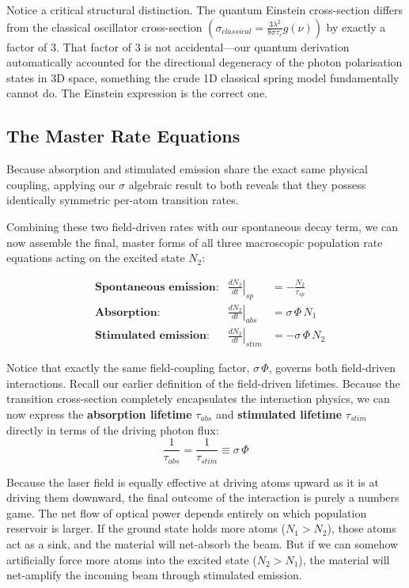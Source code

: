 Notice a critical structural distinction. The quantum Einstein cross-section differs from the classical oscillator cross-section $\left(\sigma_{classical} = \frac{3\lambda^2}{8\pi\tau_r}g(\nu)\right)$ by exactly a factor of 3. That factor of 3 is not accidental—our quantum derivation automatically accounted for the directional degeneracy of the photon polarisation states in 3D space, something the crude 1D classical spring model fundamentally cannot do. The Einstein expression is the correct one.

\subsection{The Master Rate Equations}

Because absorption and stimulated emission share the exact same physical coupling, applying our $\sigma$ algebraic result to both reveals that they possess identically symmetric per-atom transition rates.

Combining these two field-driven rates with our spontaneous decay term, we can now assemble the final, master forms of all three macroscopic population rate equations acting on the excited state $N_2$:

\begin{keyresult}
    \begin{align}
         & \textbf{Spontaneous emission:} & \left.\frac{dN_2}{dt}\right|_{sp}   & = -\frac{N_2}{\tau_{sp}} \\[8pt]
         & \textbf{Absorption:}           & \left.\frac{dN_2}{dt}\right|_{abs}  & = \sigma\,\Phi\,N_1      \\[8pt]
         & \textbf{Stimulated emission:}  & \left.\frac{dN_2}{dt}\right|_{stim} & = -\sigma\,\Phi\,N_2
    \end{align}
\end{keyresult}

Notice that exactly the same field-coupling factor, $\sigma\,\Phi$, governs both field-driven interactions. Recall our earlier definition of the field-driven lifetimes. Because the transition cross-section completely encapsulates the interaction physics, we can now express the \textbf{absorption lifetime} $\tau_{abs}$ and \textbf{stimulated lifetime} $\tau_{stim}$ directly in terms of the driving photon flux:
\begin{equation*}
    \frac{1}{\tau_{abs}} = \frac{1}{\tau_{stim}} \equiv \sigma\,\Phi
\end{equation*}

Because the laser field is equally effective at driving atoms upward as it is at driving them downward, the final outcome of the interaction is purely a numbers game. The net flow of optical power depends entirely on which population reservoir is larger. If the ground state holds more atoms ($N_1 > N_2$), those atoms act as a sink, and the material will net-absorb the beam. But if we can somehow artificially force more atoms into the excited state ($N_2 > N_1$), the material will net-amplify the incoming beam through stimulated emission.

